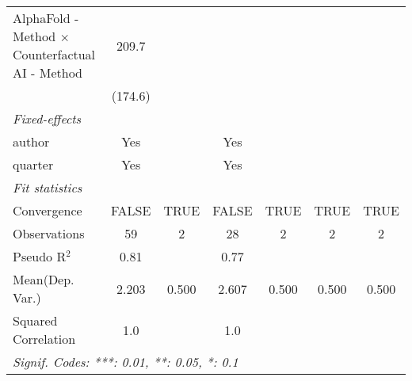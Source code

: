 \begin{tabular}{lcccccc}
   AlphaFold - Method $\times$ Counterfactual AI - Method  & 209.7          &      &         &      &      &   \\   
                                                           & (174.6)        &      &         &      &      &   \\   
   \midrule
   \emph{Fixed-effects}\\
   author                                                  & Yes            &      & Yes     &      &      & \\  
   quarter                                                 & Yes            &      & Yes     &      &      & \\  
   \midrule
   \emph{Fit statistics}\\
   Convergence                                             &FALSE           & TRUE & FALSE   & TRUE & TRUE & TRUE\\  
   Observations                                            & 59             & 2    & 28      & 2    & 2    & 2\\  
   Pseudo R$^2$                                            & 0.81           &      & 0.77    &      &      & \\  
Mean(Dep. Var.) & 2.203 & 0.500 & 2.607 & 0.500 & 0.500 & 0.500 \\
   Squared Correlation                                     & 1.0            &      & 1.0     &      &      & \\  
   \midrule \midrule
   \multicolumn{7}{l}{\emph{Signif. Codes: ***: 0.01, **: 0.05, *: 0.1}}\\
\end{tabular}
\par\endgroup
